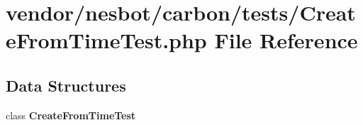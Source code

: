 \section{vendor/nesbot/carbon/tests/\+Create\+From\+Time\+Test.php File Reference}
\label{_create_from_time_test_8php}
\subsection*{Data Structures}
\begin{DoxyCompactItemize}
\item 
class {\bf Create\+From\+Time\+Test}
\end{DoxyCompactItemize}
